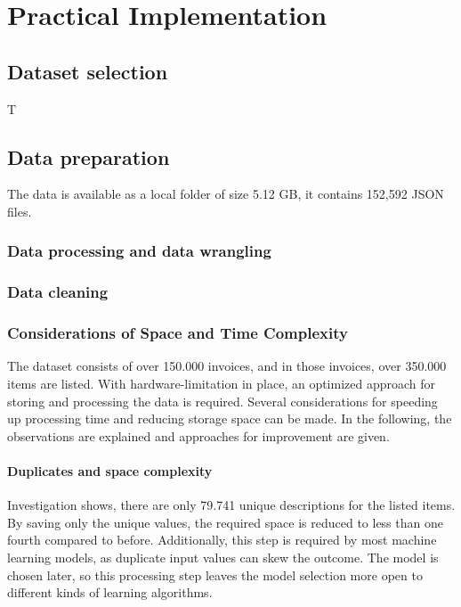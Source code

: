 \chapter{Practical Implementation}

\section{Dataset selection}
	T
	
\section{Data preparation}
	The data is available as a local folder of size 5.12 GB, it contains 152,592 \ac{JSON} files.

	\subsection{Data processing and data wrangling}
	
	
	\subsection{Data cleaning}
	
	\subsection{Considerations of Space and Time Complexity}
	The dataset consists of over 150.000 invoices, and in those invoices, over 350.000 items are listed. 
	With hardware-limitation in place, an optimized approach for storing and processing the data is required. 
	Several considerations for speeding up processing time and reducing storage space can be made. 
	In the following, the observations are explained and approaches for improvement are given.

		\subsubsection{Duplicates and space complexity}
		Investigation shows, there are only 79.741 unique descriptions for the listed items. By saving only the unique values, the required space is reduced to less than one fourth compared to before. Additionally, this step is required by most machine learning models, as duplicate input values can skew the outcome. The model is chosen later, so this processing step leaves the model selection more open to different kinds of learning algorithms.
		
